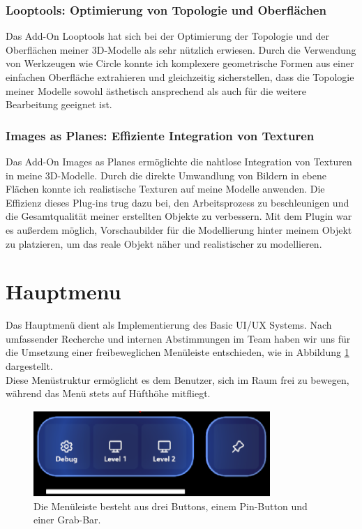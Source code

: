 \subsubsection{Looptools: Optimierung von Topologie und Oberflächen}

Das Add-On Looptools hat sich bei der Optimierung der Topologie und der Oberflächen meiner 3D-Modelle als sehr nützlich
erwiesen. Durch die Verwendung von Werkzeugen wie Circle konnte ich komplexere geometrische Formen aus einer einfachen Oberfläche
extrahieren und gleichzeitig sicherstellen, dass die Topologie meiner Modelle sowohl ästhetisch ansprechend als auch für die weitere
Bearbeitung geeignet ist.

\subsubsection{Images as Planes: Effiziente Integration von Texturen}

Das Add-On Images as Planes ermöglichte die nahtlose Integration von Texturen in meine 3D-Modelle. Durch die direkte
Umwandlung von Bildern in ebene Flächen konnte ich realistische Texturen auf meine Modelle anwenden. Die Effizienz dieses
Plug-ins trug dazu bei, den Arbeitsprozess zu beschleunigen und die Gesamtqualität meiner erstellten Objekte zu verbessern.
Mit dem Plugin war es außerdem möglich, Vorschaubilder für die Modellierung hinter meinem Objekt zu platzieren, um das
reale Objekt näher und realistischer zu modellieren.

\section{Hauptmenu}
Das Hauptmenü dient als Implementierung des Basic UI/UX Systems. Nach umfassender Recherche und internen
Abstimmungen im Team haben wir uns für die Umsetzung einer freibeweglichen Menüleiste entschieden, wie in
Abbildung \ref{fig:menübar} dargestellt.
\\
Diese Menüstruktur ermöglicht es dem Benutzer, sich im Raum frei zu bewegen, während das Menü stets
auf Hüfthöhe mitfliegt.

\begin{figure}[h]
\centering
\includegraphics[width=0.8\textwidth]{images/menubar.png}
\caption{Die Menüleiste besteht aus drei Buttons, einem Pin-Button und einer Grab-Bar.}
\label{fig:menübar}
\end{figure}


